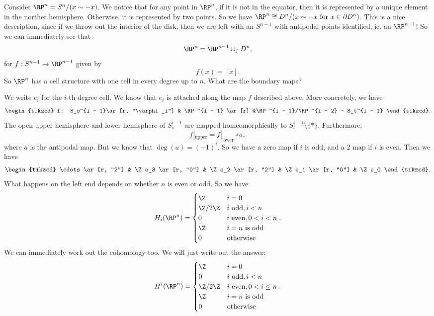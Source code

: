 \documentclass[a4paper]{article}
\begin{document}
\begin{eg}
  Consider $\RP^n = S^n/(x \sim -x)$. We notice that for any point in $\RP^n$, if it is not in the equator, then it is represented by a unique element in the norther hemisphere. Otherwise, it is represented by two points. So we have $\RP^n \cong D^n/(x \sim -x\text{ for }x \in \partial D^n)$. This is a nice description, since if we throw out the interior of the disk, then we are left with an $S^{n - 1}$ with antipodal points identified, ie. an $\RP^{n - 1}$! So we can immediately see that
  \[
    \RP^n = \RP^{n - 1} \cup_f D^n,
  \]
  for $f: S^{n - 1} \to \RP^{n - 1}$ given by
  \[
    f(x) = [x].
  \]
  So $\RP^n$ has a cell structure with one cell in every degree up to $n$. What are the boundary maps?

  We write $e_i$ for the $i$-th degree cell. We know that $e_i$ is attached along the map $f$ described above. More concretely, we have
  \[
    \begin{tikzcd}
      f: S_s^{i - 1}\ar[r, "\varphi_i"] & \RP^{i - 1} \ar[r] &\RP^{i - 1}/\RP^{i - 2} = S_t^{i - 1}
    \end{tikzcd}.
  \]
  The open upper hemisphere and lower hemisphere of $S^{i - 1}_s$ are mapped homeomorphically to $S_t^{i - 1} \setminus \{*\}$. Furthermore,
  \[
    f|_{\mathrm{upper}} = f|_{\mathrm{lower}} \circ a,
  \]
  where $a$ is the antipodal map. But we know that $\deg(a) = (-1)^i$. So we have a zero map if $i$ is odd, and a $2$ map if $i$ is even. Then we have
  \[
    \begin{tikzcd}
      \cdots \ar[r, "2"] & \Z e_3 \ar[r, "0"] & \Z e_2 \ar[r, "2"] & \Z e_1 \ar[r, "0"] & \Z e_0
    \end{tikzcd}.
  \]
  What happens on the left end depends on whether $n$ is even or odd. So we have
  \[
    H_i(\RP^n) =
    \begin{cases}
      \Z & i = 0\\
      \Z/2\Z & i\text{ odd}, i < n\\
      0 & i\text{ even}, 0 < i < n\\
      \Z & i = n\text{ is odd}\\
      0 & \text{otherwise}
    \end{cases}.
  \]
  We can immediately work out the cohomology too. We will just write out the answer:
  \[
    H^i(\RP^n) =
    \begin{cases}
      \Z & i = 0\\
      0 & i\text{ odd}, i < n\\
      \Z/2\Z & i\text{ even}, 0 < i \leq n\\
      \Z & i = n\text{ is odd}\\
      0 & \text{otherwise}
    \end{cases}.
  \]
\end{eg}
\end{document}
